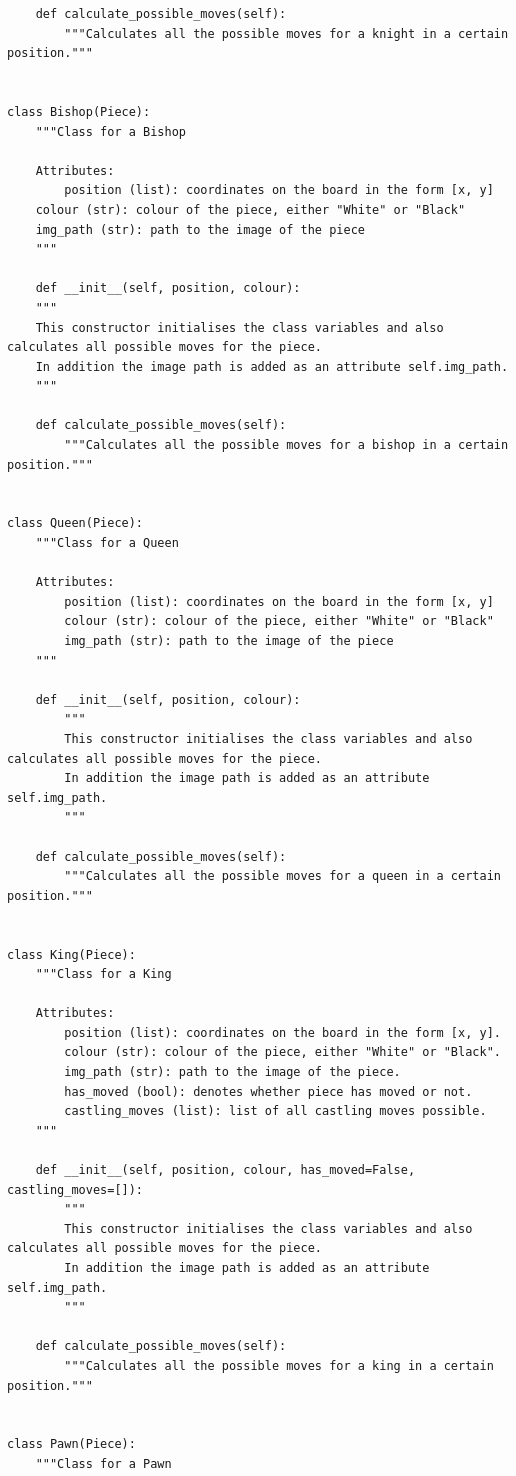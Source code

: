 \documentclass[twoside, 12pt]{report}
\begin{document}
\begin{verbatim}
 	def calculate_possible_moves(self):
		"""Calculates all the possible moves for a knight in a certain position."""
	

class Bishop(Piece):
	"""Class for a Bishop

	Attributes:
		position (list): coordinates on the board in the form [x, y]
	colour (str): colour of the piece, either "White" or "Black"
	img_path (str): path to the image of the piece
	"""
	
	def __init__(self, position, colour):
	"""
	This constructor initialises the class variables and also calculates all possible moves for the piece.
	In addition the image path is added as an attribute self.img_path.
	"""
	
 	def calculate_possible_moves(self):
		"""Calculates all the possible moves for a bishop in a certain position."""
	

class Queen(Piece):
	"""Class for a Queen

	Attributes:
		position (list): coordinates on the board in the form [x, y]
		colour (str): colour of the piece, either "White" or "Black"
		img_path (str): path to the image of the piece
	"""

	def __init__(self, position, colour):
		"""
		This constructor initialises the class variables and also calculates all possible moves for the piece.
		In addition the image path is added as an attribute self.img_path.
		"""
	
 	def calculate_possible_moves(self):
		"""Calculates all the possible moves for a queen in a certain position."""
		

class King(Piece):
	"""Class for a King

	Attributes:
		position (list): coordinates on the board in the form [x, y].
		colour (str): colour of the piece, either "White" or "Black".
		img_path (str): path to the image of the piece.
		has_moved (bool): denotes whether piece has moved or not.
		castling_moves (list): list of all castling moves possible.
	"""

	def __init__(self, position, colour, has_moved=False, castling_moves=[]):
		"""
		This constructor initialises the class variables and also calculates all possible moves for the piece.
		In addition the image path is added as an attribute self.img_path.
		"""
	
 	def calculate_possible_moves(self):
		"""Calculates all the possible moves for a king in a certain position."""

	
class Pawn(Piece):
	"""Class for a Pawn


\end{verbatim}
\end{document}
